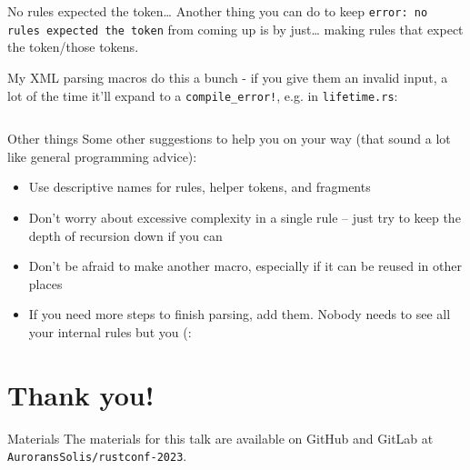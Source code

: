 \documentclass{beamer}
\newcommand{\errred}[1]{{\color{errredcolour}#1}}
\begin{document}
	\begin{frame}[fragile]{No rules expected the token\dots}
		Another thing you can do to keep \texttt{\errred{error}: no rules expected the token} from
		coming up is by just\dots{} making rules that expect the token/those tokens. \\

		\pause

		My XML parsing macros do this a bunch - if you give them an invalid input, a lot of the
		time it'll expand to a \texttt{compile\_error!}, e.g. in \texttt{lifetime.rs}:
		\inputminted[firstline = 342, lastline = 354]{rust}{../trait-xml/src/lifetime.rs}
	\end{frame}

	\begin{frame}{Other things}
		Some other suggestions to help you on your way (that sound a lot like general programming
		advice):
		\begin{itemize}
			\item Use descriptive names for rules, helper tokens, and fragments
			\item Don't worry about excessive complexity in a single rule -- just try to keep the
				depth of recursion down if you can
			\item Don't be afraid to make another macro, especially if it can be reused in other
				places
			\item If you need more steps to finish parsing, add them. Nobody needs to see all your
				internal rules but you (:
		\end{itemize}
	\end{frame}

	\section{Thank you!}
	\begin{frame}{Materials}
		The materials for this talk are available on GitHub and GitLab at
		\texttt{AuroransSolis/rustconf-2023}.
	\end{frame}
\end{document}
